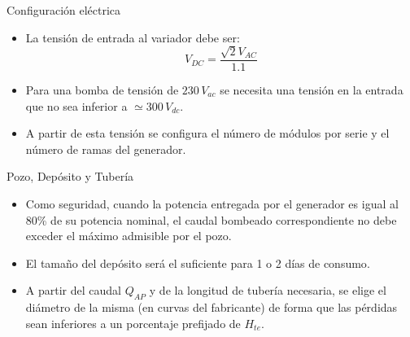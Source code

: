 \documentclass[xcolor={usenames,svgnames,dvipsnames}]{beamer}
\begin{document}
\begin{frame}[label={sec:org4ea60af}]{Configuración eléctrica}
\begin{itemize}
\item La \alert{tensión de entrada al variador} debe ser:$$V_{DC}=\frac{\sqrt{2}V_{AC}}{1.1}$$

\item Para una bomba de tensión de \(230\, V_{ac}\) se necesita una tensión en la entrada que no sea inferior a \(\simeq300\, V_{dc}\).

\item A partir de esta tensión se configura el \alert{número de módulos por serie} y el \alert{número de ramas} del generador.
\end{itemize}
\end{frame}

\begin{frame}[label={sec:org03176db}]{Pozo, Depósito y Tubería}
\begin{itemize}
\item Como seguridad, cuando la potencia entregada por el generador es igual al 80\% de su potencia nominal, el caudal bombeado correspondiente no debe exceder el máximo admisible por el pozo.
\item El \alert{tamaño del depósito} será el suficiente para \alert{1 o 2 días de consumo}.
\item A partir del caudal \(Q_{AP}\) y de la longitud de tubería necesaria, se elige el \alert{diámetro} de la misma (en curvas del fabricante) de forma que las pérdidas sean inferiores a un porcentaje prefijado de \(H_{te}\).
\end{itemize}
\end{frame}
\end{document}
